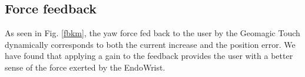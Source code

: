 %     
%     
\subsection{Force feedback}
As seen in Fig. \ref{fbkm}, the yaw force fed back to the user by the Geomagic Touch dynamically corresponds to both the current increase and the position error.
We have found that applying a gain to the feedback provides the user with a better sense of the force exerted by the EndoWrist.




